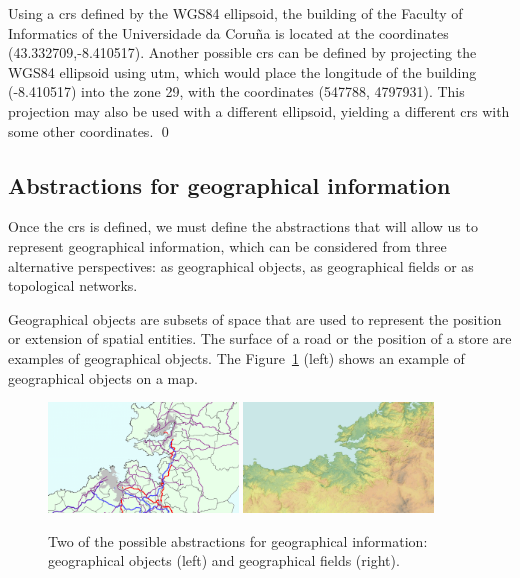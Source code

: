     \begin{example}
    Using a \gls{crs} defined by the WGS84 ellipsoid, the building of the Faculty of Informatics of the Universidade da Coru\~na is located at the coordinates (43.332709,-8.410517).
    Another possible \gls{crs} can be defined by projecting the WGS84 ellipsoid using \gls{utm}, which would place the longitude of the building (-8.410517) into the zone 29, with the coordinates (547788, 4797931). This projection may also be used with a different ellipsoid, yielding a different \gls{crs} with some other coordinates.
    \qed
    \end{example}
    
    \subsection{Abstractions for geographical information}
    Once the \gls{crs} is defined, we must define the abstractions that will allow us to represent geographical information, which can be considered from three alternative perspectives: as geographical objects, as geographical fields or as topological networks.
    
    Geographical objects are subsets of space that are used to represent the position or extension of spatial entities. The surface of a road or the position of a store are examples of geographical objects. The Figure~\ref{fig:geo:concept} (left) shows an example of geographical objects on a map.
    
    \begin{figure}[ht]
		\begin{center}
			{\includegraphics[width=0.45\textwidth]{figures/geo_object.png}}
			{\includegraphics[width=0.45\textwidth]{figures/geo_field.png}}
		\end{center}
		\caption{Two of the possible abstractions for geographical information: geographical objects (left) and geographical fields (right).}
		\label{fig:geo:concept}
	\end{figure}
    

